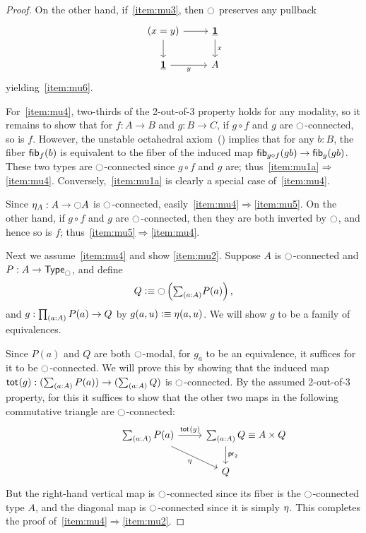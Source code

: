 \begin{proof}
  On the other hand, if~\ref{item:mu3}, then $\modal$ preserves any pullback
  \begin{equation}
  \begin{tikzcd}
  (x=y) \arrow[r] \arrow[d] 
    & \unit \arrow[d,"x"] \\
  \unit \arrow[r,"y"'] 
    & A
  \end{tikzcd}
  \end{equation}
  yielding~\ref{item:mu6}.

  For~\ref{item:mu4}, two-thirds of the 2-out-of-3 property holds for any modality, so it remains to show that for $f:A\to B$ and $g:B\to C$, if $g\circ f$ and $g$ are $\modal$-connected, so is $f$.
  However, the unstable octahedral axiom~(\cite[ex4.4]{TheBook}) implies that for any $b:B$, the fiber $\fib f b$ is equivalent to the fiber of the induced map $\fib{g\circ f}{gb} \to \fib{g}{gb}$.
  These two types are $\modal$-connected since $g\circ f$ and $g$ are; thus~\ref{item:mu1a}$\Rightarrow$\ref{item:mu4}.
  Conversely,~\ref{item:mu1a} is clearly a special case of~\ref{item:mu4}.

  Since $\modalunit[A] : A\to \modal A$ is $\modal$-connected, easily~\ref{item:mu4}$\Rightarrow$\ref{item:mu5}.
  On the other hand, if $g\circ f$ and $g$ are $\modal$-connected, then they are both inverted by $\modal$, and hence so is $f$; thus~\ref{item:mu5}$\Rightarrow$\ref{item:mu4}.

  Next we assume~\ref{item:mu4} and show \ref{item:mu2}.
  Suppose $A$ is $\modal$-connected and $P:A\to\modaltype$, and define
  \[ Q \defeq \modal\left(\sm{a:A} P(a)\right),\]
  and $g:\prd{a:A} P(a) \to Q$ by $g(a,u) \defeq \modalunit(a,u)$.
  We will show $g$ to be a family of equivalences.

  Since $P(a)$ and $Q$ are both $\modal$-modal, for $g_a$ to be an equivalence, it suffices for it to be $\modal$-connected.
  We will prove this by showing that the induced map $\total g:(\sm{a:A} P(a)) \to (\sm{a:A} Q)$ is $\modal$-connected.
  By the assumed 2-out-of-3 property, for this it suffices to show that the other two maps in the following commutative triangle are $\modal$-connected:
  \begin{equation}
  \begin{tikzcd}
  \sm{a:A} P(a) \arrow[r,"{\total g}"] \arrow[dr,swap,"{\modalunit}"]
    & \sm{a:A} Q \mathrlap{\;\jdeq A\times Q} \arrow[d,"\proj2"] \\
  & Q
  \end{tikzcd}
  \end{equation}
  But the right-hand vertical map is $\modal$-connected since its fiber is the $\modal$-connected type $A$,
  and the diagonal map is $\modal$-connected since it is simply $\modalunit$.
  This completes the proof of~\ref{item:mu4}$\Rightarrow$\ref{item:mu2}.


\end{proof}

